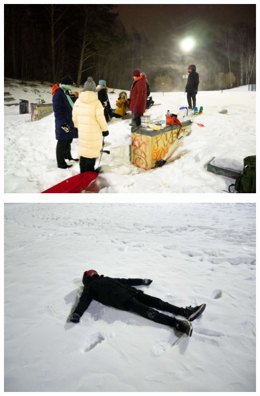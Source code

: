 \documentclass[10pt,finnish,a5paper,headings=small,twoside=semi]{scrartcl}
\begin{document}
\begin{multicols}{2}

	\vspace*{0.16cm}
	\noindent\includegraphics[width=\linewidth]{assets/laskiaistiistai1}

	\vspace*{0.16cm}
	\noindent\includegraphics[width=\linewidth]{assets/laskiaistiistai2}

	\columnbreak


\end{multicols}
\end{document}
